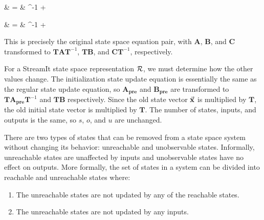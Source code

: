 \hspace{0.5in}\begin{minipage}{2.5in}
\vspace{-4pt}
\starteqnstar
{} & = &  ^{-1}  +  
\doneeqnstar
\end{minipage}
\begin{minipage}{3in}
\starteqnstar
{} & = &  ^{-1}
+ 
\doneeqnstar
\vspace{4pt}
\end{minipage}

This is precisely the original state space equation pair,
with $\mathbf{A}$, $\mathbf{B}$, and $\mathbf{C}$ transformed to
$\mathbf{T} \mathbf{A} \mathbf{T}^{-1}$, $\mathbf{T} \mathbf{B}$,
and $\mathbf{C} \mathbf{T}^{-1}$, respectively.

For a StreamIt state space representation ${\cal R}$, we must
determine how the other values change. The initialization state update
equation is essentially the same as the regular state update equation,
so $\mathbf{A_{pre}}$ and $\mathbf{B_{pre}}$ are transformed to
$\mathbf{T} \mathbf{A_{pre}} \mathbf{T}^{-1}$ and $\mathbf{T}
\mathbf{B}$ respectively. Since the old state vector
$\vec{\mathbf{x}}$ is multiplied by $\mathbf{T}$, the old initial
state vector is multiplied by $\mathbf{T}$. The number of states,
inputs, and outputs is the same, so $s$, $o$, and $u$ are unchanged.

\label{sec:state-removal}

There are two types of states that can be removed from a state space
system without changing its behavior: unreachable and unobservable
states. Informally, unreachable states are unaffected by inputs and
unobservable states have no effect on outputs. More formally, the set
of states in a system can be divided into reachable and unreachable
states where:
\begin{enumerate}
\vspace{\itemshrink} \item The unreachable states are not updated by any of the
reachable states.

\vspace{\itemshrink} \item The unreachable states are not updated by any inputs.
\vspace{\itemshrink} \end{enumerate}

